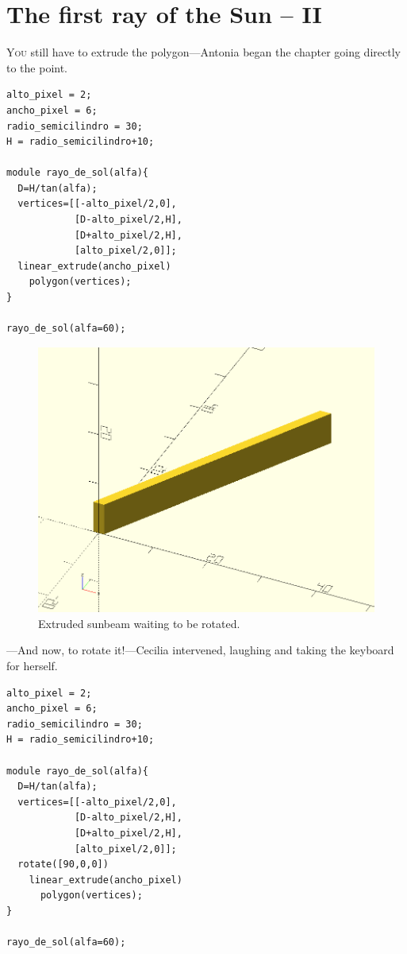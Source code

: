 
\chapter{The first ray of the Sun -- II}
\label{sec:el-primer-rayo-de-sol-ii}

\lettrine[ante=\raisebox{-1.5ex}{\Large ---},lines=2]{Y}{ou} still have to extrude the polygon---Antonia began the chapter going directly to the point.

    \begin{center}
    \begin{lstlisting}
alto_pixel = 2;
ancho_pixel = 6;
radio_semicilindro = 30;
H = radio_semicilindro+10;

module rayo_de_sol(alfa){
  D=H/tan(alfa);
  vertices=[[-alto_pixel/2,0],
            [D-alto_pixel/2,H],
            [D+alto_pixel/2,H],
            [alto_pixel/2,0]];
  linear_extrude(ancho_pixel)
    polygon(vertices);
}
 
rayo_de_sol(alfa=60);
    \end{lstlisting}
  \end{center}

  \begin{figure}[t]
    \centering
  \includegraphics[width=.6\textwidth]{imagenes/rayo-extrudido-1}  
  \caption{Extruded sunbeam waiting to be rotated.}
    \label{fig:rayo-extrudido-1}
  \end{figure}
  
---And now, to rotate it!---Cecilia intervened, laughing and taking the keyboard for herself.

\begin{lstlisting}
alto_pixel = 2;
ancho_pixel = 6;
radio_semicilindro = 30;
H = radio_semicilindro+10;

module rayo_de_sol(alfa){
  D=H/tan(alfa);
  vertices=[[-alto_pixel/2,0],
            [D-alto_pixel/2,H],
            [D+alto_pixel/2,H],
            [alto_pixel/2,0]];
  rotate([90,0,0])
    linear_extrude(ancho_pixel)
      polygon(vertices);
}
 
rayo_de_sol(alfa=60);
\end{lstlisting}

